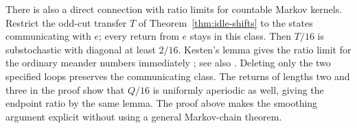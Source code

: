 There is also a direct connection with ratio limits for countable
Markov kernels. Restrict the odd-cut transfer \(T\) of
Theorem~\ref{thm:idle-shifts} to the states communicating with \(e\);
every return from \(e\) stays in this class. Then \(T/16\) is
substochastic with diagonal at least \(2/16\). Kesten's lemma gives
the ratio limit for the ordinary meander numbers immediately
\cite[Lemma~4]{K95}; see also \cite[Lemma~1.2]{MSM}.
Deleting only the two specified loops preserves the communicating
class. The returns of lengths two and three in the proof show that
\(Q/16\) is uniformly aperiodic as well, giving the endpoint
ratio by the same lemma. The proof above makes the smoothing
argument explicit without using a general Markov-chain theorem.
